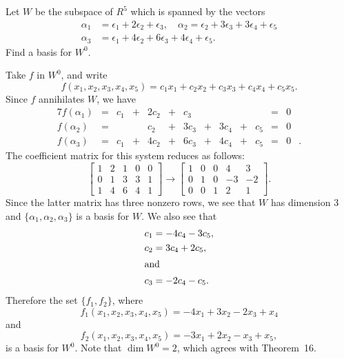 Let $W$ be the subspace of $R^5$ which is spanned by the
vectors
\begin{align*}
  \alpha_1
  &= \epsilon_1 + 2\epsilon_2 + \epsilon_3, \quad
    \alpha_2 = \epsilon_2 + 3\epsilon_3 + 3\epsilon_4 + \epsilon_5 \\
  \alpha_3
  &= \epsilon_1 + 4\epsilon_2 + 6\epsilon_3 + 4\epsilon_4 + \epsilon_5.
\end{align*}
Find a basis for $W^0$.
\begin{solution}
  Take $f$ in $W^0$, and write
  \begin{equation*}
    f(x_1,x_2,x_3,x_4,x_5)
    = c_1x_1 + c_2x_2 + c_3x_3 + c_4x_4 + c_5x_5.
  \end{equation*}
  Since $f$ annihilates $W$, we have
  \begin{alignat*}{7}
    f(\alpha_1) &{}={}&
    c_1 &{}+{}& 2c_2 &{}+{}& c_3 && && &{}={}& 0 & \\
    f(\alpha_2) &{}={}&
    && c_2 &{}+{}& 3c_3 &{}+{}& 3c_4 &{}+{}& c_5 &{}={}& 0 & \\
    f(\alpha_3) &{}={}&
    c_1 &{}+{}& 4c_2 &{}+{}& 6c_3 &{}+{}& 4c_4 &{}+{}& c_5
    &{}={}& 0 &.
  \end{alignat*}
  The coefficient matrix for this system reduces as follows:
  \begin{equation*}
    \begin{bmatrix}
      1 & 2 & 1 & 0 & 0 \\
      0 & 1 & 3 & 3 & 1 \\
      1 & 4 & 6 & 4 & 1
    \end{bmatrix}
    \rightarrow
    \begin{bmatrix}
      1 & 0 & 0 & 4 & 3 \\
      0 & 1 & 0 & -3 & -2 \\
      0 & 0 & 1 & 2 & 1
    \end{bmatrix}.
  \end{equation*}
  Since the latter matrix has three nonzero rows, we see that $W$ has
  dimension $3$ and $\{\alpha_1,\alpha_2,\alpha_3\}$ is a basis for
  $W$. We also see that
  \begin{align*}
    c_1 &= -4c_4 - 3c_5, \\
    c_2 &= 3c_4 + 2c_5, \\
    \intertext{and}
    c_3 &= -2c_4 - c_5.
  \end{align*}
  Therefore the set $\{f_1,f_2\}$, where
  \begin{equation*}
    f_1(x_1,x_2,x_3,x_4,x_5)
    = -4x_1 + 3x_2 - 2x_3 + x_4
  \end{equation*}
  and
  \begin{equation*}
    f_2(x_1,x_2,x_3,x_4,x_5)
    = -3x_1 + 2x_2 - x_3 + x_5,
  \end{equation*}
  is a basis for $W^0$. Note that $\dim W^0 = 2$, which agrees with
  Theorem~16.
\end{solution}

